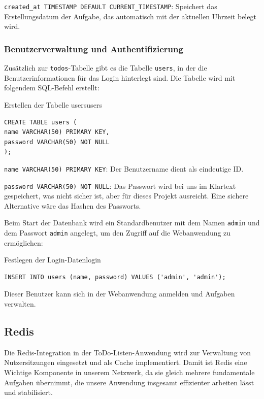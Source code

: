     \texttt{created\_at TIMESTAMP DEFAULT CURRENT\_TIMESTAMP}: Speichert das Erstellungsdatum der Aufgabe, das automatisch mit der aktuellen Uhrzeit belegt wird.



\subsubsection{Benutzerverwaltung und Authentifizierung}
Zusätzlich zur \texttt{todos}-Tabelle gibt es die Tabelle \texttt{users}, in der die Benutzerinformationen für das Login hinterlegt sind. Die Tabelle wird mit folgendem SQL-Befehl erstellt:

\begin{code}{Erstellen der Tabelle users}{users}
        \begin{verbatim}
CREATE TABLE users (
name VARCHAR(50) PRIMARY KEY,
password VARCHAR(50) NOT NULL
);
  \end{verbatim}
\end{code}

    \texttt{name VARCHAR(50) PRIMARY KEY}: Der Benutzername dient als eindeutige ID.

    \texttt{password VARCHAR(50) NOT NULL}: Das Passwort wird bei uns im Klartext gespeichert, was nicht sicher ist, aber für dieses Projekt ausreicht. Eine sichere Alternative wäre das Hashen des Passworts.

Beim Start der Datenbank wird ein Standardbenutzer mit dem Namen \texttt{admin} und dem Passwort \texttt{admin} angelegt, um den Zugriff auf die Webanwendung zu ermöglichen:

\begin{code}{Festlegen der Login-Daten}{login}
        \begin{verbatim}
INSERT INTO users (name, password) VALUES ('admin', 'admin');
  \end{verbatim}
\end{code}

Dieser Benutzer kann sich in der Webanwendung anmelden und Aufgaben verwalten.

\subsection{Redis}
Die Redis-Integration in der ToDo-Listen-Anwendung wird zur Verwaltung von Nutzersitzungen eingesetzt und als Cache implementiert. Damit ist Redis eine Wichtige Komponente in unserem Netzwerk, da sie gleich mehrere fundamentale Aufgaben übernimmt, die unsere Anwendung insgesamt effizienter arbeiten lässt und stabilisiert.

